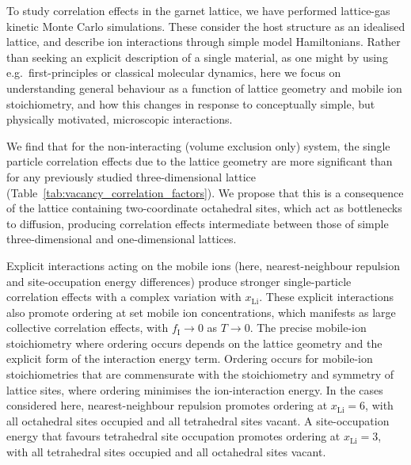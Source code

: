 \documentclass[aps,prb,twocolumn,superscriptaddress,reprint]{revtex4-1}
\newcommand{\xLi}{x_\m{Li}}
\newcommand{\m}[1]{\mathrm{#1}}
\begin{document}
To study correlation effects in the garnet lattice, we have performed  lattice-gas kinetic Monte Carlo simulations.\cite{Morgan_JOSS2017} These consider the host structure as an idealised lattice, and describe ion interactions through simple model Hamiltonians. Rather than seeking an explicit description of a single material, as one might by using e.g.\  first-principles or classical molecular dynamics,\cite{JalemEtAl_ChemMater2013,MeierEtAl_JPhysChemC2014,BurbanoEtAl_PhysRevLett2016} here we focus on understanding general behaviour as a function of lattice geometry and mobile ion stoichiometry, and how this changes in response to conceptually simple, but physically motivated, microscopic interactions.

We find that for the non-interacting (volume exclusion only) system, the single particle correlation effects due to the lattice geometry are more significant than for any previously studied three-dimensional lattice (Table~\ref{tab:vacancy_correlation_factors}). We propose that this is a consequence of the lattice containing two-coordinate octahedral sites, which act as bottlenecks to diffusion, producing correlation effects intermediate between those of simple three-dimensional and one-dimensional lattices. 

Explicit interactions acting on the mobile ions (here, nearest-neighbour repulsion and site-occupation energy differences) produce stronger single-particle correlation effects with a complex variation with $\xLi$. These explicit interactions also promote ordering at set mobile ion concentrations, which manifests as large collective correlation effects, with $f_\m{I}\to0$ as $T\to0$.\cite{Murch_SolStatIonics1982} The precise mobile-ion stoichiometry where ordering occurs depends on the lattice geometry and the explicit form of the interaction energy term. Ordering occurs for mobile-ion stoichiometries that are commensurate with the stoichiometry and symmetry of lattice sites, where ordering minimises the ion-interaction energy. In the cases considered here, nearest-neighbour repulsion promotes ordering at $\xLi=6$, with all octahedral sites occupied and all tetrahedral sites vacant. A site-occupation energy that favours tetrahedral site occupation promotes ordering at $\xLi=3$, with all tetrahedral sites occupied and all octahedral sites vacant. 
\end{document}
